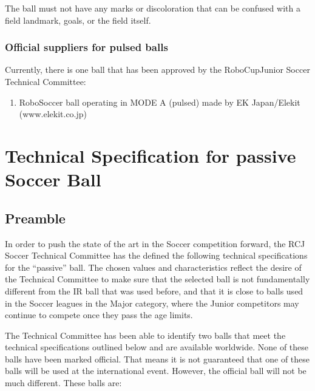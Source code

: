 \documentclass{article}
\begin{document}
The ball must not have any marks or discoloration that can be confused with a field
landmark, goals, or the field itself.

\subsubsection{Official suppliers for pulsed balls}

Currently, there is one ball that has been approved by the RoboCupJunior Soccer
Technical Committee:

\begin{enumerate}
    \item RoboSoccer ball operating in MODE A (pulsed) made by EK Japan/Elekit (www.elekit.co.jp)
\end{enumerate}

\section{Technical Specification for passive Soccer Ball\label{ref-passive-spec}}

\subsection{Preamble}

In order to push the state of the art in the Soccer competition forward, the
RCJ Soccer Technical Committee has the defined the following technical
specifications for the ``passive'' ball. The chosen values and characteristics
reflect the desire of the Technical Committee to make sure that the selected
ball is not fundamentally different from the IR ball that was used before, and
that it is close to balls used in the Soccer leagues in the Major category,
where the Junior competitors may continue to compete once they pass the age
limits.

The Technical Committee has been able to identify two balls that meet the
technical specifications outlined below and are available worldwide. None of
these balls have been marked official. That means it is not guaranteed that one
of these balls will be used at the international event. However, the official
ball will not be much different. These balls are:
\end{document}

